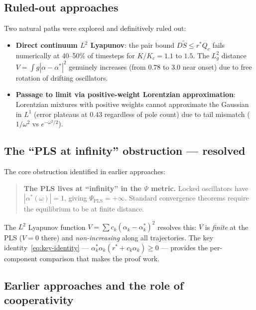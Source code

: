 \documentclass[11pt,a4paper]{article}
\theoremstyle{definition}
\begin{document}
\subsection{Ruled-out approaches}
Two natural paths were explored and definitively ruled out:
\begin{itemize}
\item \textbf{Direct continuum $L^2$ Lyapunov}: the pair bound $D\tilde{S} \leq r^*Q_c$ fails numerically at 40--50\% of timesteps for $K/K_c = 1.1$ to $1.5$. The $L^2_g$ distance $V = \int g|\alpha - \alpha^*|^2$ genuinely increases (from $0.78$ to $3.0$ near onset) due to free rotation of drifting oscillators.
\item \textbf{Passage to limit via positive-weight Lorentzian approximation}: Lorentzian mixtures with positive weights cannot approximate the Gaussian in $L^1$ (error plateaus at $0.43$ regardless of pole count) due to tail mismatch ($1/\omega^2$ vs $e^{-\omega^2/2}$).
\end{itemize}

\subsection{The ``PLS at infinity'' obstruction --- resolved}

The core obstruction identified in earlier approaches:

\begin{quote}
\textbf{The PLS lives at ``infinity'' in the $\Psi$ metric.} Locked oscillators have $|\alpha^*(\omega)| = 1$, giving $\Psi_{\mathrm{PLS}} = +\infty$. Standard convergence theorems require the equilibrium to be at finite distance.
\end{quote}

The $L^2$ Lyapunov function $V = \sum c_k(\alpha_k - \alpha^*_k)^2$ resolves this: $V$ is \emph{finite} at the PLS ($V = 0$ there) and \emph{non-increasing} along all trajectories. The key identity~\eqref{eq:key-identity} --- $\alpha^*_k\alpha_k(r^* + c_k\alpha_k) \geq 0$ --- provides the per-component comparison that makes the proof work.

\subsection{Earlier approaches and the role of cooperativity}
\end{document}
